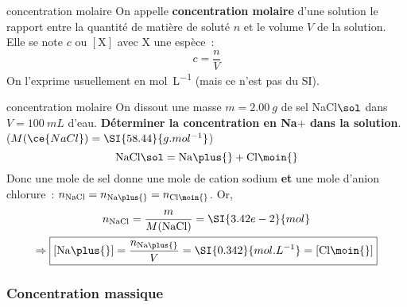 \documentclass[../main/main.tex]{subfiles}
\begin{document}
\begin{tcbraster}[raster columns=2, raster equal height=rows]
    \begin{defi}[label=def:cmol]{concentration molaire}
        On appelle \textbf{concentration molaire} d'une solution le
        rapport entre la quantité de matière de soluté $n$ et le volume $V$ de
        la solution. Elle se note $c$ ou $[\mathrm{X}]$ avec $\mathrm{X}$ une espèce~:
        \[\boxed{c = \frac{n}{V}}\]
        On l'exprime usuellement en \si{mol.L^{-1}} (mais ce n'est pas du SI).
    \end{defi}
    \begin{exem}[label=exem:cmol]{concentration molaire}
        On dissout une masse $m = \SI{2.00}{g}$ de sel NaCl$\sol$ dans $V =
        \SI{100}{mL}$ d'eau. \textbf{Déterminer la concentration en
        Na$\plus{}$ dans la solution}. ($M(\ce{NaCl}) = \SI{58.44}{g.mol^{-1}}$)
        \tcblower
        {\color{lightgray!10}
        \[{\rm NaCl}\sol = {\rm Na}\plus{} + {\rm Cl}\moin{}\]
        Donc une mole de sel donne une mole de cation sodium \textbf{et} une
        mole d'anion chlorure~: $n_{\rm NaCl} = n_{\rm Na\plus{}} = n_{\rm
        Cl\moin{}}$. Or,
        \begin{gather*}
           n_{\rm NaCl} = \frac{m}{M({\rm NaCl})} = \SI{3.42e-2}{mol} \\
           \Rightarrow
            \boxed{ \left[ {\rm Na}\plus{} \right] = \frac{n_{\rm Na\plus{}}}{V} =
                \SI{0.342}{mol.L^{-1}} = \left[ {\rm Cl}\moin{} \right]}
        \end{gather*}\vspace{-12pt}
        }
    \end{exem}
\end{tcbraster}

\subsubsection{Concentration massique}
\end{document}
